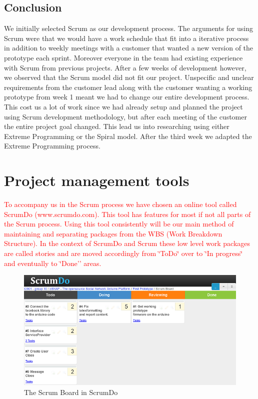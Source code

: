 \subsection{Conclusion}
We initially selected Scrum as our development process. The arguments  for using Scrum were that we would
have a work schedule that fit into a iterative process in addition to weekly meetings with a customer that
wanted a new version of the prototype each sprint. Moreover everyone in the team had existing experience 
with Scrum from previous projects. After a few weeks of development however, we observed that the Scrum
model did not fit our project. Unspecific and unclear requirements from the customer lead along with
the customer wanting a working prototype from week 1 meant we had to change our entire development
process. This cost us a lot of work since we had already setup and planned the project using Scrum 
development methodology, but after each meeting of the customer the entire project goal changed. This
lead us into researching using either Extreme Programming or the Spiral model. After the third week we
adapted the Extreme Programming process.


\section{Project management tools}

\textcolor{red}
{
To accompany us in the Scrum process we have chosen an online tool
called ScrumDo (www.scrumdo.com). This tool has features for most
if not all parts of the Scrum process. Using this tool consistently
will be our main method of maintaining and separating packages from
the WBS (Work Breakdown Structure). In the context of ScrumDo and
Scrum these low level work packages are called stories and are moved
accordingly from \char`\"{}ToDo\char`\"{} over to \char`\"{}In progress\char`\"{}
and eventually to \char`\"{}Done'' areas.
}
	
\begin{figure}[h!]
\centering \includegraphics{img/management-scrumdo} \caption{The Scrum Board in ScrumDo}

\label{fig:management-scrumdo}
\end{figure}
	
